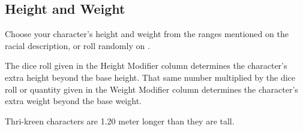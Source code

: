 
\subsection{Height and Weight}
Choose your character's height and weight from the ranges mentioned on the racial description, or roll randomly on .

The dice roll given in the Height Modifier column determines the character's extra height beyond the base height. That same number multiplied by the dice roll or quantity given in the Weight Modifier column determines the character's extra weight beyond the base weight.

Thri-kreen characters are 1.20 meter longer than they are tall.

